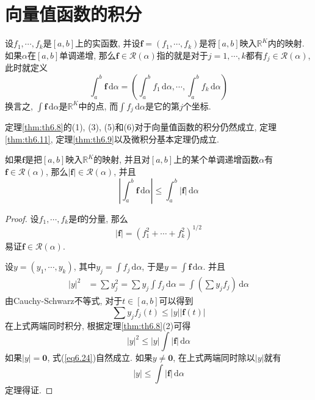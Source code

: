 \documentclass[cn,12pt,math=mtpro2,citestyle=gb7714-2015,bibstyle=gb7714-2015,twocol]{elegantbook}
\newcommand{\R}{\mathbb{R}}
\newcommand{\da}{\,\text{d}\alpha}
\newcommand{\f}{\mathbold{f}}
\newcommand{\y}{y}
\begin{document}
\section{向量值函数的积分}
\begin{definition}
设$f_1,\cdots,f_k$是$[a,b]$上的实函数, 并设$\f =(f_1,\cdots,f_k)$是将$[a,b]$映入$\R^K$内的映射. 如果$\alpha$在$[a,b]$单调递增, 那么$\f \in\mathscr{R}(\alpha)$指的就是对于$j=1,\cdots,k$都有$f_j\in\mathscr{R}(\alpha)$, 此时就定义
$$\int_{a}^{b}\f \da=\left(\int_{a}^{b}f_1\da,\cdots,\int_{a}^{b}f_k\da\right)$$
换言之, $\displaystyle \int \f \da$是$\R^K$中的点, 而$\displaystyle \int f_j\da$是它的第$j$个坐标.
\end{definition}

定理\ref{thm:th6.8}的(1), (3), (5)和(6)对于向量值函数的积分仍然成立, 定理\ref{thm:th6.11}, 定理\ref{thm:th6.9}以及微积分基本定理仍成立.

\begin{theorem}
  如果$\f $是把$[a,b]$映入$\R^K$的映射, 并且对$[a,b]$上的某个单调递增函数$\alpha$有$\f \in\mathscr{R}(\alpha)$, 那么$|\f |\in\mathscr{R}(\alpha)$, 并且
  \begin{equation}\label{eq6.24}
    \left|\int_{a}^{b}\f \da\right|\leq\int_{a}^{b}|\f |\da
  \end{equation}
\end{theorem}
\begin{proof}
  设$f_1,\cdots,f_k$是$\f $的分量, 那么
  $$|\f |=(f_1^2+\cdots+f_k^2)^{1/2}$$
  易证$\f \in\mathscr{R}(\alpha)$.

  设$\y =(y_1,\cdots,y_k)$, 其中$\displaystyle y_j=\int f_j\da$, 于是$\displaystyle \y =\int \f \da$. 并且
  \begin{align*}
  |\y |^2&=\sum y_j^2=\sum y_j\int f_j\da=\int \left(\sum y_jf_j\right)\da
  \end{align*}
  由Cauchy-Schwarz不等式, 对于$t\in[a,b]$可以得到
  $$\sum y_jf_j(t)\leq|\y ||\f (t)|$$
  在上式两端同时积分, 根据定理\ref{thm:th6.8}(2)可得
  $$|\y |^2\leq|\y |\int |\f |\da$$
  如果$|\y |=\mathbold{0}$, 式(\ref{eq6.24})自然成立. 如果$\y \neq\mathbold{0}$, 在上式两端同时除以$|\y |$就有
  $$|\y |\leq\int |\f |\da$$
  定理得证.


\end{proof}
\end{document}
